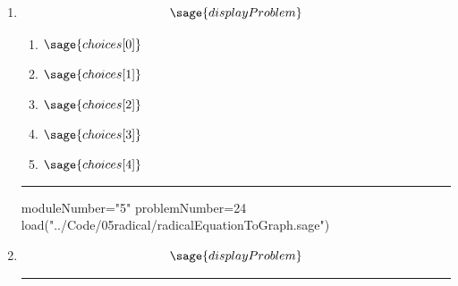 \documentclass[14pt]{extbook}
\newcommand{\litem}[1]{\item#1\hspace*{-1cm}\rule{\textwidth}{0.4pt}}
\begin{document}
\begin{enumerate}
\litem{ 

   \[ \sage{displayProblem} \]

  	\begin{enumerate}[label=\Alph*.]
    \item \( \sage{choices[0]} \)
    \item \( \sage{choices[1]} \)
    \item \( \sage{choices[2]} \)
    \item \( \sage{choices[3]} \)
    \item \( \sage{choices[4]} \)
  	\end{enumerate}
  }

\begin{sagesilent}
moduleNumber="5"
problemNumber=24
load("../Code/05radical/radicalEquationToGraph.sage")
\end{sagesilent}

\litem{ 

\[ \sage{displayProblem} \]

}
\end{enumerate}
\end{document}
